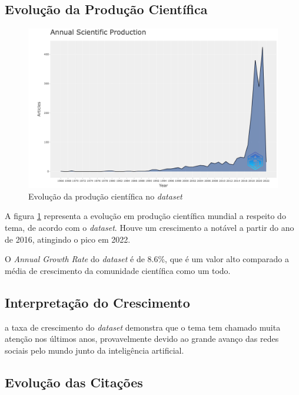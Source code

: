\subsection{Evolução da Produção Científica}

\begin{figure}
    \centering
    \includegraphics[width=1\textwidth]{experiments/tucazorron/PesquisaBibliometrica/GNN/3.png}
    \caption{Evolução da produção científica no \textit{dataset}}
    \label{fig:evol:anual:GNN@tucazorron}
\end{figure}

A figura \ref{fig:evol:anual:GNN@tucazorron} representa a evolução em produção científica mundial a respeito do tema, de acordo com o \textit{dataset}. Houve um crescimento a notável a partir do ano de 2016, atingindo o pico em 2022. 

O \textit{Annual Growth Rate} do \textit{dataset} é de 8.6\%, que é um valor alto comparado a média de crescimento da comunidade científica como um todo.

\subsection{Interpretação do Crescimento} a taxa de crescimento do \textit{dataset} demonstra que o tema tem chamado muita atenção nos últimos anos, provavelmente devido ao grande avanço das redes sociais pelo mundo junto da inteligência artificial.

\subsection{Evolução das Citações}

